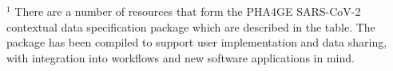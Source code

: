 \begin{table}[]
{\begin{tabular}{@{}ll@{}}
\end{tabular}%
}
\small
\item $^1$ There are a number of resources that form the PHA4GE SARS-CoV-2 contextual data specification package which are described in the table. The package has been compiled to support user implementation and data sharing, with integration into workflows and new software applications in mind.
\end{table}